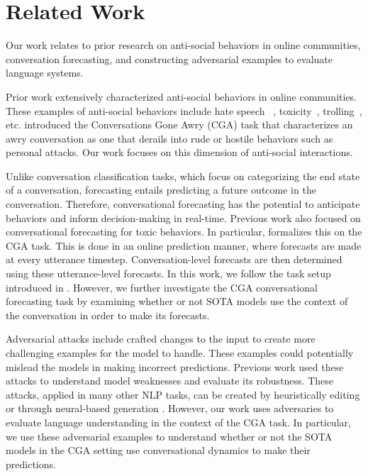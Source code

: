 \section{Related Work}
Our work relates to prior research on anti-social behaviors in online 
communities, conversation forecasting, and constructing adversarial examples
to evaluate language systems.

Prior work extensively characterized anti-social behaviors in online communities.
%
These examples of anti-social behaviors include hate speech ~\citep{rottger-etal-2021-hatecheck, elsherief-etal-2021-latent}, 
toxicity~\citep{pavlopoulos-etal-2020-toxicity, bespalov-etal-2023-towards}, trolling~\citep{mojica-de-la-vega-ng-2018-modeling, lee-etal-2022-elf22}, etc. 
%
\citet{zhang-etal-2018-conversations} introduced the Conversations Gone Awry (CGA)
task that characterizes an awry conversation as one that derails into rude or 
hostile behaviors such as personal attacks. 
%
Our work focuses on this dimension of anti-social interactions.

Unlike conversation classification tasks, which focus on categorizing the end 
state of a conversation, forecasting entails predicting a future outcome in 
the conversation. 
%
Therefore, conversational forecasting has the potential to anticipate behaviors 
and inform decision-making in real-time.
%
Previous work also focused on conversational forecasting for toxic behaviors. 
%
In particular, \citet{chang-danescu-niculescu-mizil-2019-trouble} formalizes this on the CGA 
task. 
%
This is done in an online prediction manner, where forecasts are made at every 
utterance timestep.
%
Conversation-level forecasts are then determined using these utterance-level forecasts.
%
In this work, we follow the task setup introduced in 
\citet{chang-danescu-niculescu-mizil-2019-trouble}.
%
However, we further investigate the CGA conversational forecasting task 
by examining whether or not SOTA models use the context of 
the conversation in order to make its forecasts.


Adversarial attacks include crafted changes to the input to create more challenging
examples for the model to handle.
%
These examples could potentially mislead the models in making incorrect predictions.
%
Previous work used these attacks to understand model weaknesses and evaluate its 
robustness.
%
These attacks, applied in many other NLP tasks, can be created by heuristically editing \cite{wang-bansal-2018-robust} or through neural-based generation \cite{iyyer-etal-2018-adversarial, khashabi-etal-2020-bang, bartolo-etal-2021-improving, fu-etal-2023-scene}.
%
However, our work uses adversaries to evaluate language understanding in the context of 
the CGA task. 
%
In particular, we use these adversarial examples to understand whether or not the 
SOTA models in the CGA setting use conversational dynamics to make their predictions.
